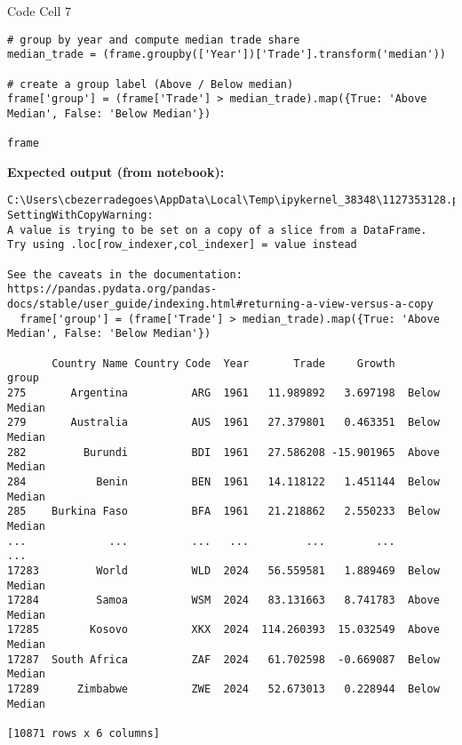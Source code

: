 \documentclass[notes,11pt, aspectratio=169, xcolor=table]{beamer}
\begin{document}
\begin{frame}[fragile]{Code Cell 7}
\begin{verbatim}
# group by year and compute median trade share
median_trade = (frame.groupby(['Year'])['Trade'].transform('median'))

# create a group label (Above / Below median)
frame['group'] = (frame['Trade'] > median_trade).map({True: 'Above Median', False: 'Below Median'})

frame
\end{verbatim}
\vspace{0.5ex}
\textbf{Expected output (from notebook):}
\begin{verbatim}
C:\Users\cbezerradegoes\AppData\Local\Temp\ipykernel_38348\1127353128.py:5: SettingWithCopyWarning: 
A value is trying to be set on a copy of a slice from a DataFrame.
Try using .loc[row_indexer,col_indexer] = value instead

See the caveats in the documentation: https://pandas.pydata.org/pandas-docs/stable/user_guide/indexing.html#returning-a-view-versus-a-copy
  frame['group'] = (frame['Trade'] > median_trade).map({True: 'Above Median', False: 'Below Median'})

       Country Name Country Code  Year       Trade     Growth         group
275       Argentina          ARG  1961   11.989892   3.697198  Below Median
279       Australia          AUS  1961   27.379801   0.463351  Below Median
282         Burundi          BDI  1961   27.586208 -15.901965  Above Median
284           Benin          BEN  1961   14.118122   1.451144  Below Median
285    Burkina Faso          BFA  1961   21.218862   2.550233  Below Median
...             ...          ...   ...         ...        ...           ...
17283         World          WLD  2024   56.559581   1.889469  Below Median
17284         Samoa          WSM  2024   83.131663   8.741783  Above Median
17285        Kosovo          XKX  2024  114.260393  15.032549  Above Median
17287  South Africa          ZAF  2024   61.702598  -0.669087  Below Median
17289      Zimbabwe          ZWE  2024   52.673013   0.228944  Below Median

[10871 rows x 6 columns]
\end{verbatim}
\end{frame}
\end{document}
